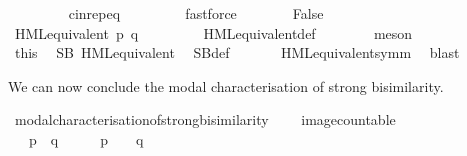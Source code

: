 \begin{isabellebody}
\ \ \ \ \ \ \isamarkupfalse%
\ {\isacharasterisk}{\kern0pt}{\isacharparenleft}{\kern0pt}{}{\isacharcomma}{\kern0pt}{}{\isacharparenright}{\kern0pt}\ cin{\isachardot}{\kern0pt}rep{\isacharunderscore}{\kern0pt}eq\ \isanewline
\ \ \ \ \ \ \isamarkupfalse%
\ fastforce\isanewline
\isanewline
\ \ \ \ \isamarkupfalse%
\ \isamarkupfalse%
\ False\ \isanewline
\ \ \ \ \ \ \isamarkupfalse%
\ {\isacartoucheopen}HML{\isacharunderscore}{\kern0pt}equivalent\ p\ q{\isacartoucheclose}\ \isanewline
\ \ \ \ \ \ \isamarkupfalse%
\ HML{\isacharunderscore}{\kern0pt}equivalent{\isacharunderscore}{\kern0pt}def\isanewline
\ \ \ \ \ \ \isamarkupfalse%
\ meson\isanewline
\ \ \isacommand{{\isacharbraceright}{\kern0pt}}\isamarkupfalse%
\isanewline
\isanewline
\ \ %
\isanewline
\ \ %
\isanewline
\ \ \isamarkupfalse%
\ this\ \isamarkupfalse%
\ {\isacartoucheopen}SB\ HML{\isacharunderscore}{\kern0pt}equivalent{\isacartoucheclose}\ \isamarkupfalse%
\ SB{\isacharunderscore}{\kern0pt}def\ \isanewline
\ \ \ \ \isamarkupfalse%
\ HML{\isacharunderscore}{\kern0pt}equivalent{\isacharunderscore}{\kern0pt}symm\ \isamarkupfalse%
\ blast\isanewline
{}\isamarkupfalse%
%
\endisatagvisible
{\isafoldvisible}%
%
\isadelimvisible
%
\endisadelimvisible
%
\begin{isamarkuptext}%
\pagebreak
We can now conclude the modal characterisation of strong bisimilarity.%
\end{isamarkuptext}\isamarkuptrue%
%
\isadelimvisible
%
\endisadelimvisible
%
\isatagvisible
{}\isamarkupfalse%
\ modal{\isacharunderscore}{\kern0pt}characterisation{\isacharunderscore}{\kern0pt}of{\isacharunderscore}{\kern0pt}strong{\isacharunderscore}{\kern0pt}bisimilarity{\isacharcolon}{\kern0pt}\ \isanewline
\ \ \ {\isacartoucheopen}image{\isacharunderscore}{\kern0pt}countable{\isacartoucheclose}\isanewline
\ \ \ {\isacartoucheopen}{\isacharparenleft}{\kern0pt}p\ {\isasymleftrightarrow}\ q{\isacharparenright}{\kern0pt}\ \ {\isasymLongleftrightarrow}\ \ {\isacharparenleft}{\kern0pt}{\isasymforall}\ {\isasymphi}{\isachardot}{\kern0pt}\ p\ {\isasymTurnstile}\ {\isasymphi}\ {\isasymlongleftrightarrow}\ q\ {\isasymTurnstile}\ {\isasymphi}{\isacharparenright}{\kern0pt}{\isacartoucheclose}\isanewline

\end{isabellebody}
